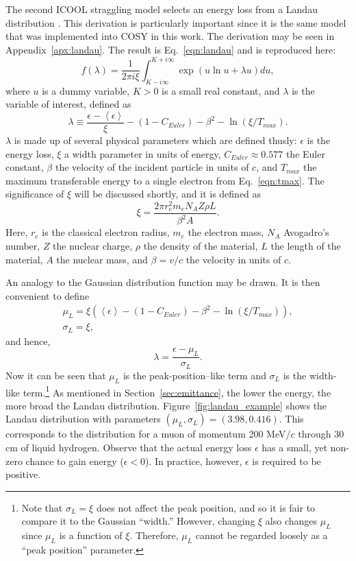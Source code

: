 \label{ssc:ICOOLStragglingLandau}
The second ICOOL straggling model selects an energy loss from a Landau distribution \cite{landau}. This derivation is particularly important since it is the same model that was implemented into COSY in this work. The derivation may be seen in Appendix~\ref{apx:landau}. The result is Eq.~\eqref{eqn:landau} and is reproduced here:
\begin{equation}\label{eqn:landau}
f(\lambda)=\frac{1}{2\pi i \xi} \int_{K-i\infty} ^{K+i\infty} \exp\left(u\ln u + \lambda u\right) du,
\end{equation}
where $u$ is a dummy variable, $K>0$ is a small real constant, and $\lambda$ is the variable of interest, defined as
\begin{equation}\label{eqn:landauParameter}
\lambda \equiv \frac{\epsilon-\left<\epsilon\right>}{\xi}-(1-C_{Euler})-\beta ^2 -\ln (\xi/T_{max}).
\end{equation}
$\lambda$ is made up of several physical parameters which are defined thusly: $\epsilon$ is the energy loss, $\xi$ a width parameter in units of energy, $C_{Euler}\approx 0.577$ the Euler constant, $\beta$ the velocity of the incident particle in units of $c$, and $T_{max}$ the maximum transferable energy to a single electron from Eq.~\eqref{eqn:tmax}. The significance of $\xi$ will be discussed shortly, and it is defined as 
\begin{equation}\label{eqn:xi}
\xi=\frac{2\pi r_e ^2 m_e N_A Z\rho L}{\beta^2 A}.
\end{equation}
Here, $r_e$ is the classical electron radius, $m_e$ the electron mass, $N_A$ Avogadro's number, $Z$ the nuclear charge, $\rho$ the density of the material, $L$ the length of the material, $A$ the nuclear mass, and $\beta=v/c$ the velocity in units of $c$.

An analogy to the Gaussian distribution function may be drawn. It is then convenient to define
\begin{gather*}
\mu_L = \xi\left(\left<\epsilon\right>-(1-C_{Euler})-\beta^2-\ln(\xi/T_{max})\right),\\
\sigma_L=\xi,
\end{gather*}
and hence,
\[
\lambda=\frac{\epsilon-\mu_L}{\sigma_L}.
\]
Now it can be seen that $\mu_L$ is the peak-position--like term and $\sigma_L$ is the width-like term.\footnote{Note that $\sigma_L=\xi$ does not affect the peak position, and so it is fair to compare it to the Gaussian ``width.'' However, changing $\xi$ also changes $\mu_L$ since $\mu_L$ is a function of $\xi$. Therefore, $\mu_L$ cannot be regarded loosely as a ``peak position'' parameter.} As mentioned in Section~\ref{sec:emittance}, the lower the energy, the more broad the Landau distribution. Figure~\ref{fig:landau_example} shows the Landau distribution with parameters $(\mu_L,\sigma_L)=(3.98, 0.416)$. This corresponds to the distribution for a muon of momentum 200 MeV/$c$ through 30 cm of liquid hydrogen. Observe that the actual energy loss $\epsilon$ has a small, yet non-zero chance to gain energy ($\epsilon<0$). In practice, however, $\epsilon$ is required to be positive.

